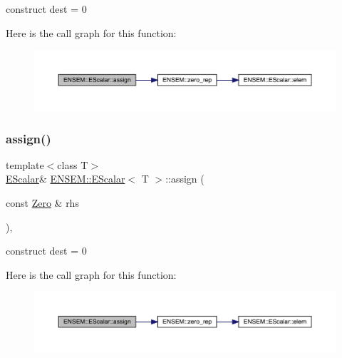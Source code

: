 construct dest = 0 

Here is the call graph for this function\+:
\nopagebreak
\begin{figure}[H]
\begin{center}
\leavevmode
\includegraphics[width=350pt]{d0/d82/classENSEM_1_1EScalar_a6900444b0a609115a30ef8fc95a43da5_cgraph}
\end{center}
\end{figure}
\mbox{\label{classENSEM_1_1EScalar_a6900444b0a609115a30ef8fc95a43da5}} 
\subsubsection{\texorpdfstring{assign()}{assign()}\hspace{0.1cm}{\footnotesize\ttfamily [6/9]}}
{\footnotesize\ttfamily template$<$class T$>$ \\
\mbox{\hyperlink{classENSEM_1_1EScalar}{E\+Scalar}}\& \mbox{\hyperlink{classENSEM_1_1EScalar}{E\+N\+S\+E\+M\+::\+E\+Scalar}}$<$ T $>$\+::assign (\begin{DoxyParamCaption}\item[{const \mbox{\hyperlink{structENSEM_1_1Zero}{Zero}} \&}]{rhs }\end{DoxyParamCaption})\hspace{0.3cm}{\ttfamily [inline]}, {\ttfamily [protected]}}



construct dest = 0 

Here is the call graph for this function\+:
\nopagebreak
\begin{figure}[H]
\begin{center}
\leavevmode
\includegraphics[width=350pt]{d0/d82/classENSEM_1_1EScalar_a6900444b0a609115a30ef8fc95a43da5_cgraph}
\end{center}
\end{figure}
\mbox{\label{classENSEM_1_1EScalar_aa9a54e03830d13eb6a124c64c6a46dd1}} 
